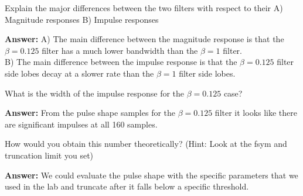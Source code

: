 \documentclass{article}
\begin{document}
\clearpage
\pagebreak
\begin{enumerate}
  \begin{item}
  Explain the major differences between the two filters with respect to their
    A) Magnitude responses 
    B) Impulse responses

  \textbf{Answer:}
    A) The main difference between the magnitude response is that the $\beta = 0.125$ filter has
    a much lower bandwidth than the $\beta = 1$ filter.\\

    B) The main difference between the impulse response is that the $\beta = 0.125$ filter
    side lobes decay at a slower rate than the $\beta = 1$ filter side lobes.
  \end{item}

  \begin{item}
    What is the width of the impulse response for the $\beta = 0.125$ case? 

  \textbf{Answer:}
    From the pulse shape samples for the $\beta = 0.125$ filter it looks like there are significant impulses at all 160 samples.
  \end{item}

  \begin{item}
    How would you obtain this number theoretically? (Hint: Look at the fsym and truncation limit you set)

  \textbf{Answer:}
    We could evaluate the pulse shape with the specific parameters that we used in the lab and truncate after it falls below a specific threshold.
  \end{item}

\end{enumerate}
\end{document}
